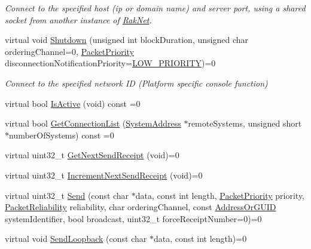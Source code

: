 \begin{DoxyCompactItemize}
\begin{DoxyCompactList}\small\item\em Connect to the specified host (ip or domain name) and server port, using a shared socket from another instance of \hyperlink{namespace_rak_net}{Rak\-Net}. \end{DoxyCompactList}\item 
virtual void \hyperlink{class_rak_net_1_1_rak_peer_interface_a4f4acefdc022555862fd386e31f9a22b}{Shutdown} (unsigned int block\-Duration, unsigned char ordering\-Channel=0, \hyperlink{_packet_priority_8h_a659378374e516180f93640c79f59705c}{Packet\-Priority} disconnection\-Notification\-Priority=\hyperlink{_packet_priority_8h_a659378374e516180f93640c79f59705cadb8ee22a232a2787f32ba28da55c43c1}{L\-O\-W\-\_\-\-P\-R\-I\-O\-R\-I\-T\-Y})=0
\begin{DoxyCompactList}\small\item\em Connect to the specified network I\-D (Platform specific console function) \end{DoxyCompactList}\item 
virtual bool \hyperlink{class_rak_net_1_1_rak_peer_interface_affcba03406b89157976cf0e6a8924d66}{Is\-Active} (void) const =0
\item 
virtual bool \hyperlink{class_rak_net_1_1_rak_peer_interface_a5706fd26cf90bd45d0658d8b9a7d8111}{Get\-Connection\-List} (\hyperlink{struct_rak_net_1_1_system_address}{System\-Address} $\ast$remote\-Systems, unsigned short $\ast$number\-Of\-Systems) const =0
\item 
virtual uint32\-\_\-t \hyperlink{class_rak_net_1_1_rak_peer_interface_a8587fe2920712adddfa06950ff6b8998}{Get\-Next\-Send\-Receipt} (void)=0
\item 
virtual uint32\-\_\-t \hyperlink{class_rak_net_1_1_rak_peer_interface_a9a406f292a6c44f551e9d8606992558e}{Increment\-Next\-Send\-Receipt} (void)=0
\item 
virtual uint32\-\_\-t \hyperlink{class_rak_net_1_1_rak_peer_interface_a543ec5be9cf5f73f5c8733d1829789f9}{Send} (const char $\ast$data, const int length, \hyperlink{_packet_priority_8h_a659378374e516180f93640c79f59705c}{Packet\-Priority} priority, \hyperlink{_packet_priority_8h_ae41fa01235e99dced384d137fa874a7e}{Packet\-Reliability} reliability, char ordering\-Channel, const \hyperlink{struct_rak_net_1_1_address_or_g_u_i_d}{Address\-Or\-G\-U\-I\-D} system\-Identifier, bool broadcast, uint32\-\_\-t force\-Receipt\-Number=0)=0
\item 
virtual void \hyperlink{class_rak_net_1_1_rak_peer_interface_ab8e39273dd7fb89d4b29a01bca32f82c}{Send\-Loopback} (const char $\ast$data, const int length)=0

\end{DoxyCompactItemize}
